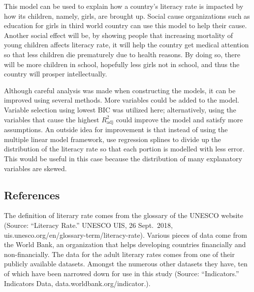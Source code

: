 \documentclass[]{article}
\begin{document}
This model can be used to explain how a country's literacy rate is
impacted by how its children, namely, girls, are brought up. Social
cause organizations such as education for girls in third world country
can use this model to help their cause. Another social effect will be,
by showing people that increasing mortality of young children affects
literacy rate, it will help the country get medical attention so that
less children die prematurely due to health reasons. By doing so, there
will be more children in school, hopefully less girls not in school, and
thus the country will prosper intellectually.

Although careful analysis was made when constructing the models, it can
be improved using several methods. More variables could be added to the
model. Variable selection using lowest BIC was utilized here;
alternatively, using the variables that cause the highest
\(R^2_{\text{adj}}\) could improve the model and satisfy more
assumptions. An outside idea for improvement is that instead of using
the multiple linear model framework, use regression splines to divide up
the distribution of the literacy rate so that each portion is modelled
with less error. This would be useful in this case because the
distribution of many explanatory variables are skewed.

\hypertarget{references}{%
\subsection{References}\label{references}}

The definition of literary rate comes from the glossary of the UNESCO
website (Source: ``Literacy Rate.'' UNESCO UIS, 26 Sept.~2018,
uis.unesco.org/en/glossary-term/literacy-rate). Various pieces of data
come from the World Bank, an organization that helps developing
countries financially and non-financially. The data for the adult
literary rates comes from one of their publicly available datasets.
Amongst the numerous other datasets they have, ten of which have been
narrowed down for use in this study (Source: ``Indicators.'' Indicators
\textbar{} Data, data.worldbank.org/indicator.).
\end{document}
